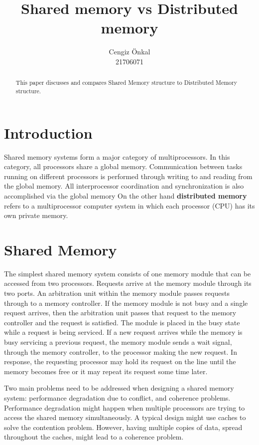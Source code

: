 \documentclass[11pt]{article}
\title{\textbf{Shared memory vs Distributed memory}}
\author{Cengiz Önkal\\21706071}
\date{}
\begin{document}
\maketitle

\begin{abstract}
This paper discusses and compares Shared Memory structure to Distributed Memory structure.
\end{abstract}




\section{Introduction}
Shared memory systems form a major category of multiprocessors. In this category,
all processors share a global memory. Communication between tasks running on
different processors is performed through writing to and reading from the global
memory. All interprocessor coordination and synchronization is also accomplished
via the global memory
On the other hand \textbf{distributed memory} refers to a multiprocessor computer system in which each processor (CPU) has its own private memory.

\section{Shared Memory}
The simplest shared memory system consists of one memory module that can be accessed from two processors. Requests arrive at the memory module through its two ports. An arbitration unit within the memory
module passes requests through to a memory controller. If the memory module is
not busy and a single request arrives, then the arbitration unit passes that request
to the memory controller and the request is satisfied. The module is placed in the
busy state while a request is being serviced. If a new request arrives while the
memory is busy servicing a previous request, the memory module sends a wait
signal, through the memory controller, to the processor making the new request.
In response, the requesting processor may hold its request on the line until the
memory becomes free or it may repeat its request some time later.\cite{el2005advanced} 


Two main problems need to be addressed when designing a shared memory
system: performance degradation due to conflict, and coherence problems. Performance degradation might happen when multiple processors are trying to access the shared memory simultaneously. A typical design might use caches to solve the contention problem. However, having multiple copies of data, spread throughout the caches, might lead to a coherence problem. 
\end{document}

